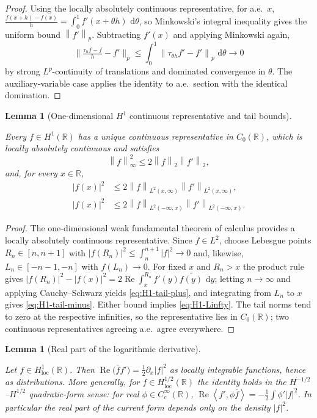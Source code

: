 \documentclass[11pt,oneside]{book}
\providecommand{\uses}[1]{}
\newtheorem{lemma}[theorem]{Lemma}
\theoremstyle{definition}
\theoremstyle{remark}
\newcommand{\R}{\mathbb R}
\newcommand{\1}{\mathbf 1}
\newcommand{\loc}{\mathrm{loc}}
\newcommand{\Rea}{\operatorname{Re}}
\newcommand{\dd}{\,\mathrm d}
\newcommand{\norm}[1]{\left\lVert #1\right\rVert}
\newcommand{\abs}[1]{\left\lvert #1\right\rvert}
\newcommand{\pair}[2]{\left\langle #1,#2\right\rangle}
\begin{document}
\begin{proof}
Using the locally absolutely continuous representative, for a.e.\ $x$,
$\frac{f(x+h)-f(x)}{h}=\int_0^1 f'(x+\theta h)\,\dd\theta$, so Minkowski's
integral inequality gives the uniform bound $\norm{f'}_p$. Subtracting $f'(x)$
and applying Minkowski again,
\[
 \Big\|\tfrac{\tau_hf-f}{h}-f'\Big\|_p
 \le\int_0^1\norm{\tau_{\theta h}f'-f'}_p\,\dd\theta\longrightarrow0
\]
by strong $L^p$-continuity of translations and dominated convergence in
$\theta$. The auxiliary-variable case applies the identity to a.e.\ section with
the identical domination.
\end{proof}

\begin{lemma}[One-dimensional $H^1$ continuous representative and tail bounds]\label{lem:H1-C0}
\uses{lem:Wp-difference-quotient}
Every $f\in H^1(\R)$ has a unique continuous representative in $C_0(\R)$, which
is locally absolutely continuous and satisfies
\begin{equation}
 \norm{f}_\infty^2\le2\norm{f}_2\norm{f'}_2,
 \label{eq:H1-Linfty}
\end{equation}
and, for every $x\in\R$,
\begin{align}
 \abs{f(x)}^2&\le2\norm{f}_{L^2(x,\infty)}\norm{f'}_{L^2(x,\infty)},\label{eq:H1-tail-plus}\\
 \abs{f(x)}^2&\le2\norm{f}_{L^2(-\infty,x)}\norm{f'}_{L^2(-\infty,x)}.\label{eq:H1-tail-minus}
\end{align}
\end{lemma}

\begin{proof}
The one-dimensional weak fundamental theorem of calculus provides a locally
absolutely continuous representative. Since $f\in L^2$, choose Lebesgue points
$R_n\in[n,n+1]$ with $\abs{f(R_n)}^2\le\int_n^{n+1}\abs{f}^2\to0$ and, likewise,
$L_n\in[-n-1,-n]$ with $f(L_n)\to0$. For fixed $x$ and $R_n>x$ the product rule
gives $\abs{f(R_n)}^2-\abs{f(x)}^2=2\Rea\int_x^{R_n}f'(y)\overline{f(y)}\,\dd y$;
letting $n\to\infty$ and applying Cauchy--Schwarz yields
\eqref{eq:H1-tail-plus}, and integrating from $L_n$ to $x$ gives
\eqref{eq:H1-tail-minus}. Either bound implies \eqref{eq:H1-Linfty}. The tail
norms tend to zero at the respective infinities, so the representative lies in
$C_0(\R)$; two continuous representatives agreeing a.e.\ agree everywhere.
\end{proof}

\begin{lemma}[Real part of the logarithmic derivative]\label{lem:realpart-logform}
\uses{lem:H1-C0}
Let $f\in H^1_{\loc}(\R)$. Then $\Rea\bigl(\overline f f'\bigr)=\tfrac12\partial_x\abs f^2$ as
locally integrable functions, hence as distributions. More generally, for
$f\in H^{1/2}_{\loc}(\R)$ the identity holds in the $H^{-1/2}$--$H^{1/2}$ quadratic-form sense:
for real $\phi\in C_c^\infty(\R)$, $\Rea\pair{f'}{\phi\overline f}=-\tfrac12\int\phi'\abs f^2$.
In particular the real part of the current form depends only on the density $\abs f^2$.
\end{lemma}
\end{document}
